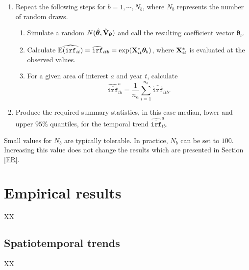\documentclass[10pt] {article}
\newcommand{\E}{\mathbb{E}}
\newcommand{\X}{{\bf X}}
\theoremstyle{definition}
\theoremstyle{plain}
\begin{document}
\begin{enumerate}
	\item Repeat the following steps for $b=1,\cdots,N_b$, where $N_b$ represents the number of random draws. 
	   \begin{enumerate}
	      \item Simulate a random $N(\hat{\bm\theta}, \hat{{\bf V}}_{\bm\theta} )$ and call the resulting coefficient vector $\bm\theta_b$.
	      \item Calculate $\widehat{\E(\texttt{irf}_{it})}=\widehat{\texttt{irf}}_{itb}=\exp(\X^*_{it}\bm\theta_b)$, where $\X^*_{it}$ is evaluated at the observed values. 
	      \item For a given area of interest $a$ and year $t$, calculate
	      $$\widehat{\overline{\texttt{irf}}}_{tb}^a=\frac{1}{n_a}\sum_{i=1}^{n_a} \widehat{\texttt{irf}}_{itb}.$$    
	   \end{enumerate}
	\item Produce the required summary statistics, in this case median, lower and upper $95\%$ quantiles, for the temporal trend $\widehat{\overline{\texttt{irf}}}_{tb}^a$.
\end{enumerate}
Small values for $N_b$ are typically tolerable. In practice, $N_b$ can be set to $100$. Increasing this value does not change the results which are presented in Section \ref{ER}.
 

\section{Empirical results \label{ER}}
XX

\subsection{Spatiotemporal trends \label{STT}}
XX
\end{document}
